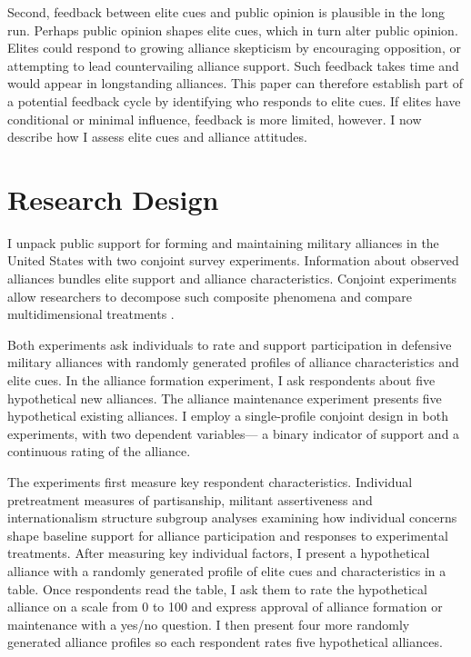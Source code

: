 \documentclass[12pt]{article}
\begin{document}
Second, feedback between elite cues and public opinion is plausible in the long run. 
Perhaps public opinion shapes elite cues, which in turn alter public opinion. 
Elites could respond to growing alliance skepticism by encouraging opposition, or attempting to lead countervailing alliance support.
Such feedback takes time and would appear in longstanding alliances.
This paper can therefore establish part of a potential feedback cycle by identifying who responds to elite cues.  
If elites have conditional or minimal influence, feedback is more limited, however.
I now describe how I assess elite cues and alliance attitudes. 



\section{Research Design}



I unpack public support for forming and maintaining military alliances in the United States with two conjoint survey experiments. 
Information about observed alliances bundles elite support and alliance characteristics. 
Conjoint experiments allow researchers to decompose such composite phenomena and compare multidimensional treatments \citep{Hainmuelleretal2014}. 


Both experiments ask individuals to rate and support participation in defensive military alliances with randomly generated profiles of alliance characteristics and elite cues. 
In the alliance formation experiment, I ask respondents about five hypothetical new alliances. 
The alliance maintenance experiment presents five hypothetical existing alliances.
I employ a single-profile conjoint design in both experiments, with two dependent variables--- a binary indicator of support and a continuous rating of the alliance.


The experiments first measure key respondent characteristics.  
Individual pretreatment measures of partisanship, militant assertiveness and internationalism structure subgroup analyses examining how individual concerns shape baseline support for alliance participation and responses to experimental treatments. 
After measuring key individual factors, I present a hypothetical alliance with a randomly generated profile of elite cues and characteristics in a table.
Once respondents read the table, I ask them to rate the hypothetical alliance on a scale from 0 to 100 and express approval of alliance formation or maintenance with a yes/no question. 
I then present four more randomly generated alliance profiles so each respondent rates five hypothetical alliances.
\end{document}
